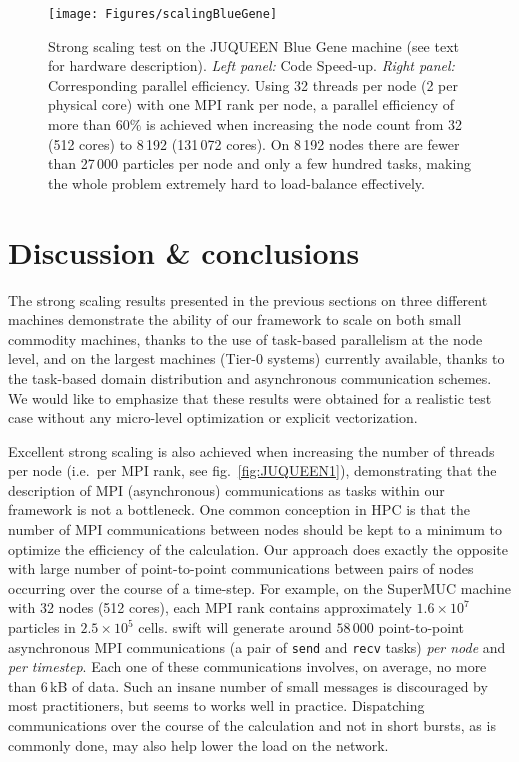 \documentclass{sig-alternate-05-2015}
\newcommand{\swift}{{\sc swift}\xspace}
\begin{document}
\begin{figure*}
\centering
\texttt{[image: Figures/scalingBlueGene]}
\caption{Strong scaling test on the JUQUEEN Blue Gene machine (see text
  for hardware description). \textit{Left panel:} Code
  Speed-up. \textit{Right panel:} Corresponding parallel efficiency.
  Using 32 threads per node (2 per physical core) with one MPI rank
  per node, a parallel efficiency of more than $60\%$ is achieved when
  increasing the node count from 32 (512 cores) to 8\,192 (131\,072
  cores). On 8\,192 nodes there are fewer than 27\,000 particles per
  node and only a few hundred tasks, making the whole problem
  extremely hard to load-balance effectively.
  \label{fig:JUQUEEN2}}
\end{figure*}






\section{Discussion \& conclusions}

The strong scaling results presented in the previous sections on
three different machines demonstrate the ability of our framework
to scale on both small commodity
machines, thanks to the use of task-based parallelism at the node level, and on
the largest machines (Tier-0 systems) currently available, thanks to the
task-based domain distribution and asynchronous communication schemes.
We would like to emphasize that these results were obtained for a
realistic test case without any micro-level optimization or explicit
vectorization.

Excellent strong scaling is also achieved when increasing the number of threads
per node (i.e.~per MPI rank, see fig.~\ref{fig:JUQUEEN1}), demonstrating that
the description of MPI (asynchronous) communications as tasks within our
framework is not a bottleneck. One common conception in HPC is that the number
of MPI communications between nodes should be kept to a minimum to optimize the
efficiency of the calculation. Our approach does exactly the opposite with large
number of point-to-point communications between pairs of nodes occurring over the
course of a time-step. For example, on the SuperMUC machine with 32 nodes (512
cores), each MPI rank contains approximately $1.6\times10^7$ particles in
$2.5\times10^5$ cells. \swift will generate around $58\,000$ point-to-point
asynchronous MPI communications (a pair of \texttt{send} and \texttt{recv} tasks)
{\em per node} and {\em per timestep}. Each one of these communications involves,
on average, no more than 6\,kB of data. Such an insane number of small messages is
discouraged by most practitioners, but seems to works well in practice.
Dispatching communications
over the course of the calculation and not in short bursts, as is commonly done,
may also help lower the load on the network.
\end{document}
